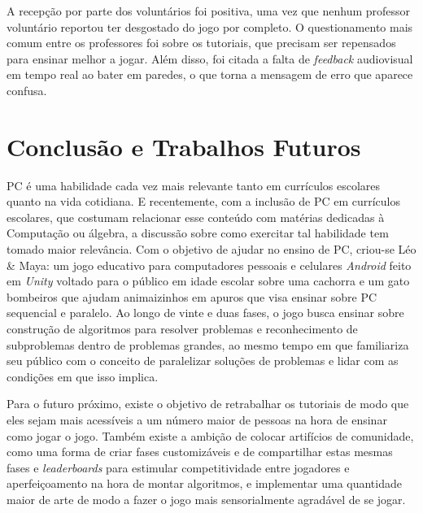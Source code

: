 \documentclass[conference]{IEEEtran}
\begin{document}
A recepção por parte dos voluntários foi positiva, uma vez que nenhum professor voluntário reportou ter desgostado do jogo por completo. O questionamento mais comum entre os professores foi sobre os tutoriais, que precisam ser repensados para ensinar melhor a jogar. Além disso, foi citada a falta de \textit{feedback} audiovisual em tempo real ao bater em paredes, o que torna a mensagem de erro que aparece confusa.

\section{Conclusão e Trabalhos Futuros}

PC é uma habilidade cada vez mais relevante tanto em currículos escolares quanto na vida cotidiana. E recentemente, com a inclusão de PC em currículos escolares, que costumam relacionar esse conteúdo com matérias dedicadas à Computação ou álgebra, a discussão sobre como exercitar tal habilidade tem tomado maior relevância. Com o objetivo de ajudar no ensino de PC, criou-se Léo \& Maya: um jogo educativo para computadores pessoais e celulares \textit{Android} feito em \textit{Unity} voltado para o público em idade escolar sobre uma cachorra e um gato bombeiros que ajudam animaizinhos em apuros que visa ensinar sobre PC sequencial e paralelo. Ao longo de vinte e duas fases, o jogo busca ensinar sobre construção de algoritmos para resolver problemas e reconhecimento de subproblemas dentro de problemas grandes, ao mesmo tempo em que familiariza seu público com o conceito de paralelizar soluções de problemas e lidar com as condições em que isso implica. 

Para o futuro próximo, existe o objetivo de retrabalhar os tutoriais de modo que eles sejam mais acessíveis a um número maior de pessoas na hora de ensinar como jogar o jogo. Também existe a ambição de colocar artifícios de comunidade, como uma forma de criar fases customizáveis e de compartilhar estas mesmas fases e \textit{leaderboards} para estimular competitividade entre jogadores e aperfeiçoamento na hora de montar algoritmos, e implementar uma quantidade maior de arte de modo a fazer o jogo mais sensorialmente agradável de se jogar.



\end{document}
